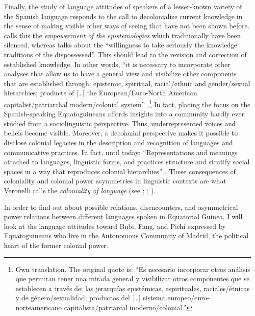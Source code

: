 \documentclass[output=paper]{langscibook}
\begin{document}
Finally, the study of language attitudes of speakers of a lesser-known variety of the Spanish language responds to the call to decolonialize current knowledge in the sense of making visible other ways of seeing that have not been shown before. \citet{lara_delgado_pensamiento_2015} calls this the \textit{empowerment of the epistemologies} which traditionally have been silenced, whereas \citet[318]{deumert_grammar_2020} talks about the “willingness to take seriously the knowledge traditions of the dispossessed”. This should lead to the revision and correction of established knowledge. In other words, “it is necessary to incorporate other analyses that allow us to have a general view and visibilize other components that are established through: epistemic, spiritual, racial/ethnic and gender/sexual hierarchies; products of […] the European/Euro-North American capitalist/patriarchal modern/colonial system” \citep[49–50]{gomez_velez_estudios_2017}.\footnote{Own translation. The original quote is: “Es necesario incorporar otros análisis que permitan tener una mirada general y visibilizar otros componentes que se establecen a través de: las jerarquías epistémicas, espirituales, raciales/étnicas y de género/sexualidad; productos del […] sistema europeo/euro-norteamericano capitalista/patriarcal moderno/colonial.”}  In fact, placing the focus on the Spanish-speaking Equatoguineans affords insights into a community hardly ever studied from a sociolinguistic perspective. Thus, underrepresented voices and beliefs become visible. Moreover, a decolonial perspective makes it possible to disclose colonial legacies in the description and recognition of languages and communicative practices. In fact, until today: “Representations and meanings attached to languages, linguistic forms, and practices structure and stratify social spaces in a way that reproduces colonial hierarchies” \citep[5]{bouchard_postcolonial_2022}. These consequences of coloniality and colonial power asymmetries in linguistic contexts are what Veronelli calls the \textit{coloniality of language} (see \citealt{veronelli_coloniality_2015}; \citeyear{veronelli_sobre_2016}; \citeyear{veronelli_colonialidad_2019}).

In order to find out about possible relations, disencounters, and asymmetrical power relations between different languages spoken in Equatorial Guinea, I will look at the language attitudes toward Bubi, Fang, and Pichi expressed by Equatoguineans who live in the Autonomous Community of Madrid, the political heart of the former colonial power.
\end{document}

